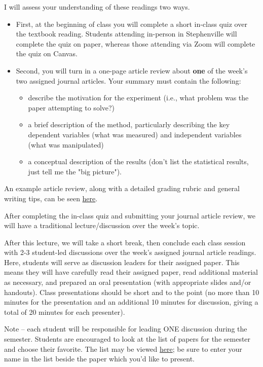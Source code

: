 \documentclass[10pt]{article}
\begin{document}
I will assess your understanding of these readings two ways.
\begin{itemize}
\item First, at the beginning of class you will complete a short in-class quiz over the textbook reading. Students attending in-person in Stephenville will complete the quiz on paper, whereas those attending via Zoom will complete the quiz on Canvas.
\item Second, you will turn in a one-page article review about \textbf{one} of the week's two assigned journal articles.  Your summary must contain the following:
\begin{itemize}
\item describe the motivation for the experiment (i.e., what problem was the paper attempting to solve?)
\item a brief description of the method, particularly describing the key dependent variables (what was measured) and independent variables (what was manipulated)
\item a conceptual description of the results (don't list the statistical results, just tell me the "big picture").
\end{itemize}
\end{itemize}

An example article review, along with a detailed grading rubric and general writing tips, can be seen \href{https://raw.githack.com/tomfaulkenberry/courses/master/canvas/5303/exampleReview.pdf}{here}.

After completing the in-class quiz and submitting your journal article review, we will have a traditional lecture/discussion over the week's topic.

After this lecture, we will take a short break, then conclude each class session with 2-3 student-led discussions over the week's assigned journal article readings. Here, students will serve as discussion leaders for their assigned paper. This means they will have carefully read their assigned paper, read additional material as necessary, and prepared an oral presentation (with appropriate slides and/or handouts).  Class presentations should be short and to the point (no more than 10 minutes for the presentation and an additional 10 minutes for discussion, giving a total of 20 minutes for each presenter).

Note -- each student will be responsible for leading ONE discussion during the semester. Students are encouraged to look at the list of papers for the semester and choose their favorite. The list may be viewed \href{https://docs.google.com/spreadsheets/d/1EyEDHDajrpZxH91b7lKSu-Le0HGNi-QrCqTrTgHdxng/edit?usp=sharing}{here}; be sure to enter your name in the list beside the paper which you'd like to present.
\end{document}
